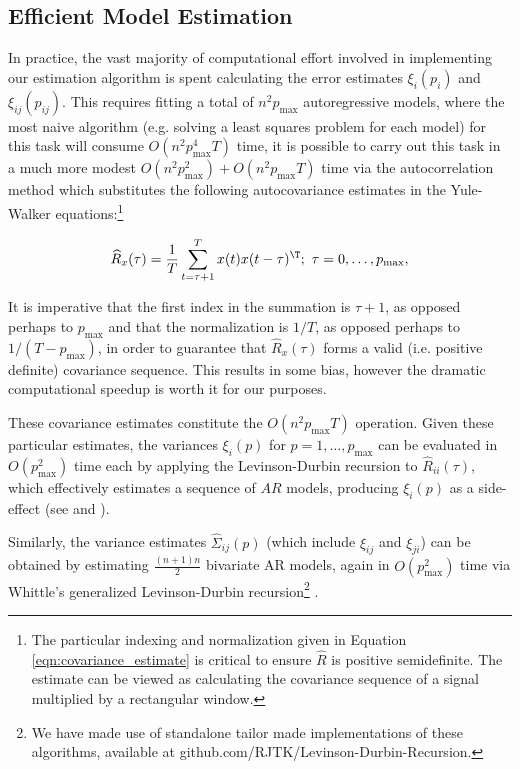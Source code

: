 \subsection{Efficient Model Estimation}
\label{sec:efficient_model_estimation}
In practice, the vast majority of computational effort involved in
implementing our estimation algorithm is spent calculating the error
estimates $\xi_i(p_i)$ and $\xi_{ij}(p_{ij})$.  This requires fitting a
total of $n^2p_{\text{max}}$ autoregressive models, where the most
naive algorithm (e.g. solving a least squares problem for each model)
for this task will consume $O(n^2p_{\text{max}}^4T)$ time, it is
possible to carry out this task in a much more modest
$O(n^2p_{\text{max}}^2 ) + O(n^2p_{\text{max}}T)$ time via the
autocorrelation method
\cite{hayes_statistical_digital_signal_processing} which substitutes
the following autocovariance estimates in the Yule-Walker
equations:\footnote{The particular indexing and normalization given in
  Equation \eqref{eqn:covariance_estimate} is critical to ensure
  $\widehat{R}$ is positive semidefinite.  The estimate can be viewed
  as calculating the covariance sequence of a signal multiplied by a
  rectangular window.}

\begin{equation}
  \label{eqn:covariance_estimate}
  \widehat{R}_x(\tau) = \frac{1}{T}\sum_{t = \tau + 1}^T x(t) x(t - \tau)^\T;\ \tau = 0, \ldots, p_{\text{max}},
\end{equation}

It is imperative that the first index in the summation is $\tau + 1$, as
opposed perhaps to $p_\text{max}$ and that the normalization is
$1 / T$, as opposed perhaps to $1 / (T - p_\text{max})$, in order to
guarantee that $\widehat{R}_x(\tau)$ forms a valid (i.e. positive
definite) covariance sequence.  This results in some bias, however the
dramatic computational speedup is worth it for our purposes.

These covariance estimates constitute the $O(n^2p_{\text{max}}T)$
operation.  Given these particular estimates, the variances $\xi_i(p)$
for $p = 1, \ldots, p_{\text{max}}$ can be evaluated in
$O(p_{\text{max}}^2)$ time each by applying the Levinson-Durbin
recursion to $\widehat{R}_{ii}(\tau)$, which effectively estimates a
sequence of $AR$ models, producing $\xi_i(p)$ as a side-effect (see
\cite{hayes_statistical_digital_signal_processing} and
\cite{levinson_durbin_recursion}).

Similarly, the variance estimates $\widehat{\Sigma}_{ij}(p)$ (which
include $\xi_{ij}$ and $\xi_{ji}$) can be obtained by estimating
$\frac{(n + 1)n}{2}$ bivariate AR models, again in
$O(p_{\text{max}}^2)$ time via Whittle's generalized Levinson-Durbin
recursion\footnote{We have made use of standalone tailor made
  implementations of these algorithms, available at
  \textsf{github.com/RJTK/Levinson-Durbin-Recursion}.}
\cite{whittle_generalized_levinson_durbin}.

